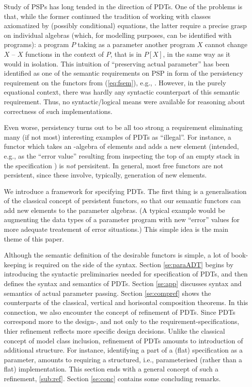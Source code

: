 Study of PSPs has long tended in the direction of PDTs. One of the problems
is that, while the former continued the tradition of working with classes
axiomatized by (possibly conditional) equations, the latter require a precise
grasp on individual algebras (which, for modelling purposes, can be
identified with programs): a program $P$ taking as a parameter another program
$X$ cannot change $X$ -- $X$ functions in the context of $P$, that is in $P[X]$, in the
same way as it would in isolation. This intuition of ``preserving actual
parameter'' has been identified as one of the semantic requirements on PSP in
form of the persistency requirement on the functors from (\ref{eq:fsem}),
e.g., \cite{Alge}.
However, in the purely equational context, there was hardly any syntactic
counterpart of this semantic requirement. Thus, no syntactic/logical means
were available for reasoning about correctness of such implementations.

Even worse, persistency turns out to be all too strong a requirement
eliminating many (if not most) interesting examples of PDTs as
``illegal''. For instance, a functor which takes an -algebra of elements and
adds a new element (intended, e.g., as the ``error value'' resulting from inspecting the top of an empty
stack in the specification ) is {\em not} persisitent. In
general, most free functors are not persistent, since these involve,
typically, generation of new elements. 

We introduce a framework for specifying PDTs. The first
thing is a generalisation of the classical concept of persistent functors, so
that our semantic functors can add new elements to the parameter algebras. 
(A typical example would be augmenting the data types of a parameter
program with new ``error'' values for more adequate treatement of error
situations.) This simple idea is the main theme of this paper. 

Although the semantic definition of the desirable functors is simple, 
a lot of book-keeping is required on the side of the syntax. 
Section \ref{se:paraADT} begins by introducing the syntactic preliminaries
needed for specification of PDTs, and then defines the syntax and semantics
of PDTs. Section \ref{se:app} discusses syntax and semantics of actual
parameter passing. Section \ref{se:compref} shows the counterparts of the
classical, vertical and horisontal composition theorems. In this connection,
we also encounter the concept of refinement of PDTs. Since PDTs correspond
more to the design-, and not only to the requirement-specifications, thier
refinement reflects more specific design decisions. Unlike the classical concept of
model class inclusion, refinement of PDTs amounts to introduction of additional
structure. For instance, identifying a part of a (flat)
specification as a parameter, amounts to requiring a structured, i.e.,
parameterised (rather than a flat) implementation. This section ends with a
general concept of such a refinement, \ref{sub:ref}.
Section \ref{se:conc} contains some concluding remarks.


